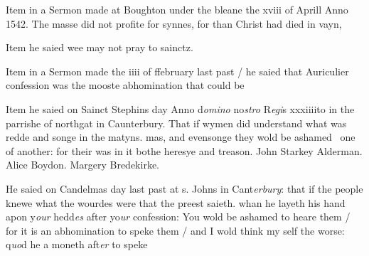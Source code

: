 \documentclass[12pt, a4paper]{book}
\begin{document}
		
		\ifthenelse{\isodd{\thepage}}
		{\reversemarginpar}
		{\normalmarginpar}
		Item in a Sermon made at Boughton under the
	 bleane the xviii of Aprill Anno 1542. The
	 masse did not profite for synnes, for than Christ
	 had died in vayn,
	 
 
			 
		\ifthenelse{\isodd{\thepage}}
		{\reversemarginpar}
		{\normalmarginpar}
		Item he saied wee may not pray to sainctz.
 
			 
		\ifthenelse{\isodd{\thepage}}
		{\reversemarginpar}
		{\normalmarginpar}
		Item in a Sermon made the iiii of ffebruary
 last past / he saied that Auriculier confession was
 the mooste abhomination that could be
 
 	
				\marginpar[\vspace{0.5cm}{\textcolor{Gray}{offensive}}]{}
			
 	
		\ifthenelse{\isodd{\thepage}}
		{\reversemarginpar}
		{\normalmarginpar}
		Item he saied on Sainct Stephins day Anno d\textit{omino}
 no\textit{stro} R\textit{egi}s xxxiiiito in the parrishe of northgat in
 	Caunterbury. That if wymen did understand
 what was redde and songe in the matyns. mas,
 and evensonge they wold be ashamed  one of
 another: for their was in it bothe heresye
 and treason. John Starkey Alderman. Alice Boydon.
 	Margery Bredekirke.
			
 
 
 	
			
 	
		\ifthenelse{\isodd{\thepage}}
		{\reversemarginpar}
		{\normalmarginpar}
		 He saied on Candelmas day last past at s. Johns
 in Cant\textit{erbury}: that if the people knewe what the
 wourdes were that the preest saieth. whan he layeth
 his hand apon y\textit{our} hedd\textit{es} after yo\textit{ur} confession: You
 wold be ashamed to heare them / for it is an
 abhomination to speke them / and I wold think
 my self the worse: q\textit{uo}d he a moneth aft\textit{er} to speke
\end{document}

